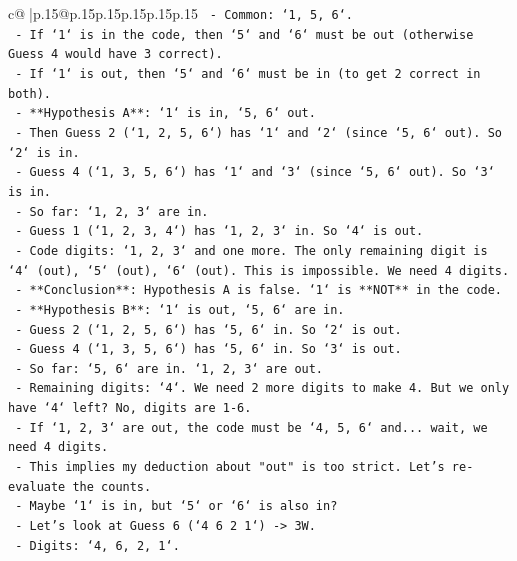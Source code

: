 \documentclass{article}
\begin{document}
{\begin{supertabular}{c@{$\;$}|p{.15\linewidth}@{}p{.15\linewidth}p{.15\linewidth}p{.15\linewidth}p{.15\linewidth}p{.15\linewidth}}
{{{\texttt{            {-} Common: `1, 5, 6`.} \\
\texttt{            {-} If `1` is in the code, then `5` and `6` must be out (otherwise Guess 4 would have 3 correct).} \\
\texttt{            {-} If `1` is out, then `5` and `6` must be in (to get 2 correct in both).} \\
\texttt{            {-} **Hypothesis A**: `1` is in, `5, 6` out.} \\
\texttt{                {-} Then Guess 2 (`1, 2, 5, 6`) has `1` and `2` (since `5, 6` out). So `2` is in.} \\
\texttt{                {-} Guess 4 (`1, 3, 5, 6`) has `1` and `3` (since `5, 6` out). So `3` is in.} \\
\texttt{                {-} So far: `1, 2, 3` are in.} \\
\texttt{                {-} Guess 1 (`1, 2, 3, 4`) has `1, 2, 3` in. So `4` is out.} \\
\texttt{                {-} Code digits: `1, 2, 3` and one more. The only remaining digit is `4` (out), `5` (out), `6` (out). This is impossible. We need 4 digits.} \\
\texttt{                {-} **Conclusion**: Hypothesis A is false. `1` is **NOT** in the code.} \\
\texttt{            {-} **Hypothesis B**: `1` is out, `5, 6` are in.} \\
\texttt{                {-} Guess 2 (`1, 2, 5, 6`) has `5, 6` in. So `2` is out.} \\
\texttt{                {-} Guess 4 (`1, 3, 5, 6`) has `5, 6` in. So `3` is out.} \\
\texttt{                {-} So far: `5, 6` are in. `1, 2, 3` are out.} \\
\texttt{                {-} Remaining digits: `4`. We need 2 more digits to make 4. But we only have `4` left? No, digits are 1{-}6.} \\
\texttt{                {-} If `1, 2, 3` are out, the code must be `4, 5, 6` and... wait, we need 4 digits.} \\
\texttt{                {-} This implies my deduction about "out" is too strict. Let's re{-}evaluate the counts.} \\
\texttt{                {-} Maybe `1` is in, but `5` or `6` is also in?} \\
\texttt{                {-} Let's look at Guess 6 (`4 6 2 1`) {-}> 3W.} \\
\texttt{                    {-} Digits: `4, 6, 2, 1`.} \\
}}}
\end{supertabular}}
\end{document}

